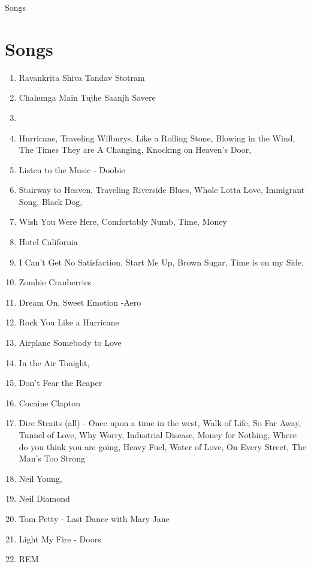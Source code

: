 \documentclass{article}
\begin{document}
Songs
\section*{Songs}
\begin{enumerate}
\item Ravankrita Shiva Tandav Stotram

\item Chahunga Main Tujhe Saanjh Savere
\item 
\item Hurricane, Traveling Wilburys, Like a Rolling Stone, Blowing in the Wind, The Times They are A Changing, Knocking on Heaven's Door, 
\item Listen to the Music - Doobie
\item Stairway to Heaven, Traveling Riverside Blues, Whole Lotta Love, Immigrant Song, Black Dog, 
\item Wish You Were Here, Comfortably Numb, Time, Money
\item Hotel California
\item I Can't Get No Satisfaction, Start Me Up, Brown Sugar, Time is on my Side,
\item Zombie Cranberries
\item Dream On, Sweet Emotion -Aero
\item Rock You Like a Hurricane
\item Airplane Somebody to Love
\item In the Air Tonight,
\item Don't Fear the Reaper
\item Cocaine Clapton
\item Dire Straits (all) - Once upon a time in the west, Walk of Life, So Far Away, Tunnel of Love, Why Worry, Industrial Disease, Money for Nothing, Where do you think you are going, Heavy Fuel, Water of Love, On Every Street, The Man's Too Strong
\item Neil Young,
\item Neil Diamond
\item Tom Petty - Last Dance with Mary Jane
\item Light My Fire - Doors
\item REM


\end{enumerate}
\end{document}
